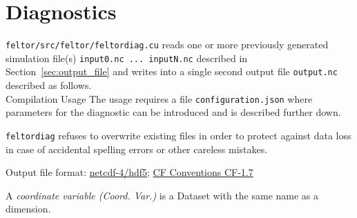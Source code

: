 \section{Diagnostics}\label{sec:diagnostics}
\texttt{feltor/src/feltor/feltordiag.cu}
reads one or more previously generated simulation file(s) \texttt{input0.nc ... inputN.nc} described in Section~\ref{sec:output_file} and writes into a
 single second output file \texttt{output.nc} described as follows. \\
Compilation
\noindent Usage
The usage requires a file \texttt{configuration.json} where parameters for the diagnostic can be introduced and is described further down.
\begin{tcolorbox}[title=Note]
\texttt{feltordiag} refuses to overwrite existing files in order to protect against data loss in case of accidental spelling
errors or other careless mistakes.
\end{tcolorbox}

Output file format: \href{https://www.unidata.ucar.edu/software/netcdf/docs/}{netcdf-4/hdf5};
\href{http://cfconventions.org/Data/cf-conventions/cf-conventions-1.7/cf-conventions.html}{CF Conventions CF-1.7}

A \textit{coordinate variable (Coord. Var.)} is a Dataset with the same name as a dimension.

